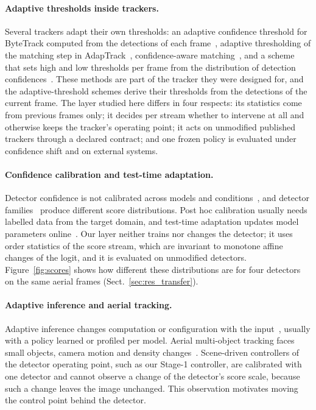 \documentclass[pdflatex,sn-mathphys-num]{sn-jnl}
\begin{document}
\paragraph{Adaptive thresholds inside trackers.} Several trackers adapt their own thresholds: an adaptive confidence threshold for ByteTrack computed from the detections of each frame~\cite{ma2023adaptivebytetrack}, adaptive thresholding of the matching step in AdapTrack~\cite{shim2024adaptrack}, confidence-aware matching~\cite{shim2024cmtrack,jung2024conftrack}, and a scheme that sets high and low thresholds per frame from the distribution of detection confidences~\cite{act2026adaptive}. These methods are part of the tracker they were designed for, and the adaptive-threshold schemes derive their thresholds from the detections of the current frame. The layer studied here differs in four respects: its statistics come from previous frames only; it decides per stream whether to intervene at all and otherwise keeps the tracker's operating point; it acts on unmodified published trackers through a declared contract; and one frozen policy is evaluated under confidence shift and on external systems.

\paragraph{Confidence calibration and test-time adaptation.} Detector confidence is not calibrated across models and conditions~\cite{kuppers2020detcalib,guo2017calibration}, and detector families~\cite{redmon2016yolo,ren2017fasterrcnn,lin2017focal,carion2020detr,zhao2024rtdetr} produce different score distributions. Post hoc calibration usually needs labelled data from the target domain, and test-time adaptation updates model parameters online~\cite{wang2021tent,liang2024ttasurvey}. Our layer neither trains nor changes the detector; it uses order statistics of the score stream, which are invariant to monotone affine changes of the logit, and it is evaluated on unmodified detectors. Figure~\ref{fig:scores} shows how different these distributions are for four detectors on the same aerial frames (Sect.~\ref{sec:res_transfer}).

\paragraph{Adaptive inference and aerial tracking.} Adaptive inference changes computation or configuration with the input~\cite{han2022dynamic,jiang2018chameleon}, usually with a policy learned or profiled per model. Aerial multi-object tracking faces small objects, camera motion and density changes~\cite{zhu2022visdrone,du2018uavdt,liu2022uavmot,wu2022uavsurvey}. Scene-driven controllers of the detector operating point, such as our Stage-1 controller, are calibrated with one detector and cannot observe a change of the detector's score scale, because such a change leaves the image unchanged. This observation motivates moving the control point behind the detector.
\end{document}
